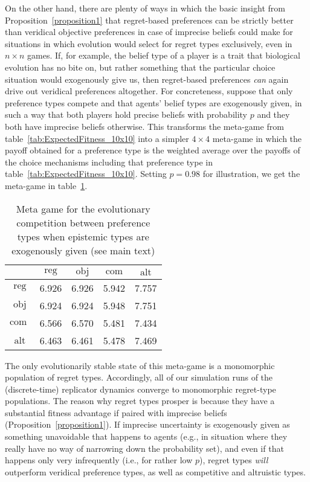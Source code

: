 \documentclass[fleqn,reqno,12pt]{article}
\theoremstyle{Satz}
\theoremstyle{Bsp}
\begin{document}
On the other hand, there are plenty of ways in which the basic insight from
Proposition~\ref{proposition1} that regret-based preferences can be strictly better than
veridical objective preferences in case of imprecise beliefs could make for situations in which
evolution would select for regret types exclusively, even in $n \times n$ games. If, for
example, the belief type of a player is a trait that biological evolution has no bite on, but rather
something that the particular choice situation would exogenously give us, then regret-based
preferences \emph{can} again drive out veridical preferences altogether. For concreteness,
suppose that only preference types compete and that agents' belief types are exogenously given,
in such a way that both players hold precise beliefs with probability $p$ and they both have imprecise
beliefs otherwise. This transforms the meta-game from table~\ref{tab:ExpectedFitness_10x10} into a
simpler $4 \times 4$ meta-game in which the payoff obtained for a preference type is the weighted
average over the payoffs of the choice mechanisms including that preference type in
table~\ref{tab:ExpectedFitness_10x10}. Setting $p = 0.98$ for illustration, we get the meta-game in table~\ref{tab:ExogeneousEpistemics}.
\begin{table}[]
\centering
\begin{tabular}{ccccc}
  \toprule
  & $\text{reg}$ 
  & $\text{obj}$
  & $\text{com}$
  & $\text{alt}$ \\ 
  \midrule
  $\text{reg} $ & 6.926 & 6.926 & 5.942 & 7.757 \\ 
  $\text{obj} $ & 6.924 & 6.924 & 5.948 & 7.751 \\ 
  $\text{com }$ & 6.566 & 6.570 & 5.481 & 7.434 \\ 
  $\text{alt} $ & 6.463 & 6.461 & 5.478 & 7.469 \\ 
   \bottomrule
\end{tabular}
\caption{Meta game for the evolutionary competition between preference types when epistemic types are exogenously
  given (see main text)}
\label{tab:ExogeneousEpistemics}
\end{table}
The only evolutionarily stable state of this meta-game is a monomorphic population of regret types. Accordingly, all of
our simulation runs of the (discrete-time) replicator dynamics converge to monomorphic
regret-type populations. The reason why regret types prosper is because they have a substantial
fitness advantage if paired with imprecise beliefs (Proposition~\ref{proposition1}). If imprecise uncertainty is exogenously given
as something unavoidable that happens to agents (e.g., in situation where they really have no
way of narrowing down the probability set), and even if that happens only very infrequently
(i.e., for rather low $p$), regret types \emph{will} outperform veridical preference types, as
well as competitive and altruistic types.
\end{document}
